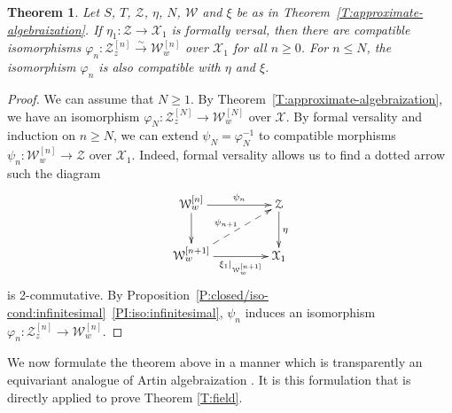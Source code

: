 \documentclass[a4paper]{amsart}
\theoremstyle{plain}
\newtheorem{theorem}{Theorem}[section]
\theoremstyle{definition}
\theoremstyle{remark}
\numberwithin{equation}{section}
\newcommand{\stX}{\mathcal{X}} %
\newcommand{\stZ}{\mathcal{Z}} %
\newcommand{\stW}{\mathcal{W}} %
\newcommand\cW{\mathcal{W}}
\newcommand\cX{\mathcal{X}}
\newcommand\cZ{\mathcal{Z}}
\newcommand\co{\colon}
\newcommand{\iso}{\stackrel{\sim}{\to}}
\newcommand{\itemref}[1]{\eqref{#1}}
\begin{document}
\begin{theorem}\label{T:algebraization}
Let $S$, $T$, $\stZ$, $\eta$, $N$, $\stW$ and $\xi$ be as in
Theorem~\ref{T:approximate-algebraization}.  If $\eta_1\colon \stZ\to \stX_1$ is formally
versal, then there are compatible isomorphisms $\varphi_n\colon \stZ_z^{[n]} \iso
\stW_w^{[n]}$ over $\stX_1$ for all $n\geq 0$. For $n\leq N$, the isomorphism
$\varphi_n$ is also compatible with $\eta$ and $\xi$.
\end{theorem}
\begin{proof}
We can assume that $N\geq 1$. By Theorem~\ref{T:approximate-algebraization}, we have an
isomorphism $\varphi_N\co \cZ_z^{[N]} \to \cW_w^{[N]}$  over
$\stX$. By formal versality and induction on $n \geq N$, we can extend $\psi_N=\varphi^{-1}_N$ to compatible morphisms
$\psi_n\colon \cW_w^{[n]}\to \cZ$ over $\stX_1$.  Indeed, formal versality allows us to find a dotted arrow such the diagram
$$\xymatrix@C+7mm{
\cW_w^{[n]} \ar[r]^-{\psi_n} \ar[d]		& \cZ \ar[d]^{\eta} \\
\cW_w^{[n+1]} \ar[r]_-{\xi_1|_{\cW_w^{[n+1]}}} \ar@{-->}[ur]^{\psi_{n+1}}	& \cX_1
}$$
is 2-commutative.  By
Proposition~\ref{P:closed/iso-cond:infinitesimal}~\itemref{PI:iso:infinitesimal}, $\psi_n$ induces an
isomorphism $\varphi_n\colon \stZ_z^{[n]}\to \stW_w^{[n]}$. 
\end{proof}

We now formulate the theorem above in a manner which is transparently an equivariant analogue of Artin algebraization \cite[Thm.~1.6]{artin-algebraization}.  It is this formulation that is directly applied to prove Theorem \ref{T:field}.
\end{document}
